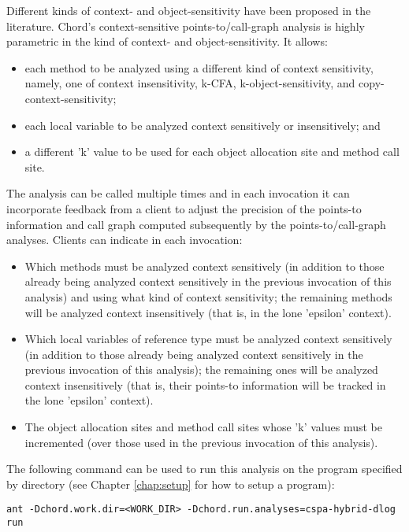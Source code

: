Different kinds of context- and object-sensitivity have been proposed in the
literature.  Chord's context-sensitive points-to/call-graph analysis is highly
parametric in the kind of context- and object-sensitivity.  It allows:
\begin{itemize}
\item
each method to be analyzed using a different kind of context sensitivity,
namely, one of context insensitivity, k-CFA, k-object-sensitivity, and
copy-context-sensitivity;
\item
each local variable to be analyzed context sensitively or insensitively; and
\item
a different 'k' value to be used for each object allocation site and method
call site.
\end{itemize}

The analysis can be called multiple times and in each invocation it can
incorporate feedback from a client to adjust the precision of the points-to
information and call graph computed subsequently by the points-to/call-graph
analyses.  Clients can indicate in each invocation:

\begin{itemize}
\item
Which methods must be analyzed context sensitively (in addition to those already being
analyzed context sensitively in the previous invocation of this analysis) and using
what kind of context sensitivity; the remaining methods will be analyzed context
insensitively (that is, in the lone 'epsilon' context).
\item
Which local variables of reference type must be analyzed context sensitively (in
addition to those already being analyzed context sensitively in the previous
invocation of this analysis); the remaining ones will be analyzed context insensitively
(that is, their points-to information will be tracked in the lone 'epsilon' context).
\item
The object allocation sites and method call sites whose 'k' values must be incremented
(over those used in the previous invocation of this analysis).
\end{itemize}

The following command can be used to run this analysis on the program specified
by directory  (see Chapter \ref{chap:setup} for how to setup a
program):

\begin{framed}
\begin{verbatim}
ant -Dchord.work.dir=<WORK_DIR> -Dchord.run.analyses=cspa-hybrid-dlog run
\end{verbatim}
\end{framed}

